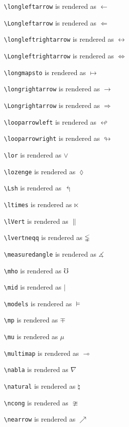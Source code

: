 \texttt{\textbackslash longleftarrow} is rendered as $\longleftarrow$


\texttt{\textbackslash Longleftarrow} is rendered as $\Longleftarrow$


\texttt{\textbackslash longleftrightarrow} is rendered as $\longleftrightarrow$


\texttt{\textbackslash Longleftrightarrow} is rendered as $\Longleftrightarrow$


\texttt{\textbackslash longmapsto} is rendered as $\longmapsto$


\texttt{\textbackslash longrightarrow} is rendered as $\longrightarrow$


\texttt{\textbackslash Longrightarrow} is rendered as $\Longrightarrow$


\texttt{\textbackslash looparrowleft} is rendered as $\looparrowleft$


\texttt{\textbackslash looparrowright} is rendered as $\looparrowright$


\texttt{\textbackslash lor} is rendered as $\lor$


\texttt{\textbackslash lozenge} is rendered as $\lozenge$


\texttt{\textbackslash Lsh} is rendered as $\Lsh$


\texttt{\textbackslash ltimes} is rendered as $\ltimes$


\texttt{\textbackslash lVert} is rendered as $\lVert$


\texttt{\textbackslash lvertneqq} is rendered as $\lvertneqq$


\texttt{\textbackslash measuredangle} is rendered as $\measuredangle$


\texttt{\textbackslash mho} is rendered as $\mho$


\texttt{\textbackslash mid} is rendered as $\mid$


\texttt{\textbackslash models} is rendered as $\models$


\texttt{\textbackslash mp} is rendered as $\mp$


\texttt{\textbackslash mu} is rendered as $\mu$


\texttt{\textbackslash multimap} is rendered as $\multimap$


\texttt{\textbackslash nabla} is rendered as $\nabla$


\texttt{\textbackslash natural} is rendered as $\natural$


\texttt{\textbackslash ncong} is rendered as $\ncong$


\texttt{\textbackslash nearrow} is rendered as $\nearrow$


